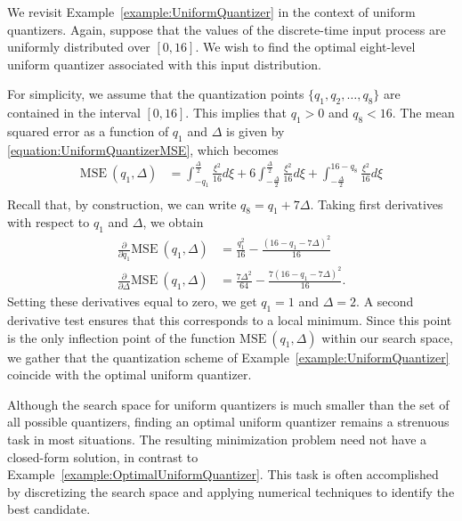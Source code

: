 \begin{example} \label{example:OptimalUniformQuantizer}
We revisit Example~\ref{example:UniformQuantizer} in the context of uniform quantizers.
Again, suppose that the values of the discrete-time input process are uniformly distributed over $[0, 16]$.
We wish to find the optimal eight-level uniform quantizer associated with this input distribution.

For simplicity, we assume that the quantization points $\{ q_1, q_2, \ldots, q_8 \}$ are contained in the interval $[0, 16]$.
This implies that $q_1 > 0$ and $q_8 < 16$.
The mean squared error as a function of $q_1$ and $\Delta$ is given by \eqref{equation:UniformQuantizerMSE}, which becomes
\begin{equation*}
\begin{split}
\text{MSE}~(q_1, \Delta)
&= \int_{-q_1}^{\frac{\Delta}{2}} \frac{\xi^2}{16} d\xi
+ 6 \int_{- \frac{\Delta}{2}}^{\frac{\Delta}{2}} \frac{\xi^2}{16} d\xi
+ \int_{- \frac{\Delta}{2}}^{16 - q_8} \frac{\xi^2}{16} d\xi \\
\end{split}
\end{equation*}
Recall that, by construction, we can write $q_8 = q_1 + 7 \Delta$.
Taking first derivatives with respect to $q_1$ and $\Delta$, we obtain
\begin{align*}
\frac{\partial}{\partial q_1} \text{MSE}~(q_1, \Delta)
&= \frac{q_1^2}{16} - \frac{(16 - q_1 - 7 \Delta)^2}{16} \\
\frac{\partial}{\partial \Delta} \text{MSE}~(q_1, \Delta)
&= \frac{7 \Delta^2}{64} - \frac{7 (16 - q_1 - 7\Delta)^2}{16} .
\end{align*}
Setting these derivatives equal to zero, we get $q_1 = 1$ and $\Delta = 2$.
A second derivative test ensures that this corresponds to a local minimum.
Since this point is the only inflection point of the function $\text{MSE}~(q_1, \Delta)$ within our search space, we gather that the quantization scheme of Example~\ref{example:UniformQuantizer} coincide with the optimal uniform quantizer.
\end{example}

Although the search space for uniform quantizers is much smaller than the set of all possible quantizers, finding an optimal uniform quantizer remains a strenuous task in most situations.
The resulting minimization problem need not have a closed-form solution, in contrast to Example~\ref{example:OptimalUniformQuantizer}.
This task is often accomplished by discretizing the search space and applying numerical techniques to identify the best candidate.


